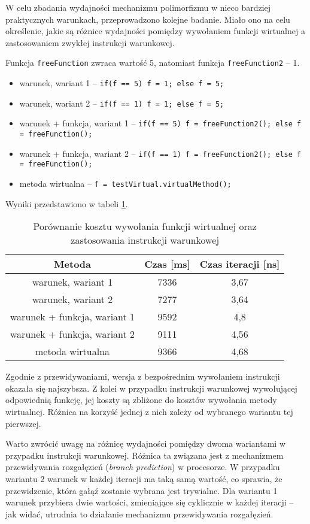 \documentclass{article}
\begin{document}
W celu zbadania wydajności mechanizmu polimorfizmu w nieco bardziej praktycznych warunkach, przeprowadzono kolejne badanie. Miało ono na celu określenie, jakie są różnice wydajności pomiędzy wywołaniem funkcji wirtualnej a zastosowaniem zwykłej instrukcji warunkowej.

Funkcja \texttt{freeFunction} zwraca wartość 5, natomiast funkcja \texttt{freeFunction2} -- 1.

\begin{itemize}
\item warunek, wariant 1 -- \texttt{if(f == 5) f = 1; else f = 5;}
\item warunek, wariant 2 -- \texttt{if(f == 1) f = 1; else f = 5;}
\item warunek + funkcja, wariant 1 -- \texttt{if(f == 5) f = freeFunction2(); else f = freeFunction();}
\item warunek + funkcja, wariant 2 -- \texttt{if(f == 1) f = freeFunction2(); else f = freeFunction();}
\item metoda wirtualna -- \texttt{f = testVirtual.virtualMethod();}
\end{itemize}

Wyniki przedstawiono w tabeli \ref{table:if}.

\begin{table}[H]
\center
\begin{tabular}{ c c c }
  \textbf{Metoda} & \textbf{Czas [ms]} & \textbf{Czas iteracji [ns]} \\ \hline
  warunek, wariant 1 & 7336 & 3,67 \\ \hline
  warunek, wariant 2 & 7277 & 3,64 \\ \hline
  warunek + funkcja, wariant 1 & 9592 & 4,8 \\ \hline
  warunek + funkcja, wariant 2 & 9111 & 4,56 \\ \hline
  metoda wirtualna & 9366 & 4,68 \\
\end{tabular}
\caption{Porównanie kosztu wywołania funkcji wirtualnej oraz zastosowania instrukcji warunkowej}
\label{table:if}
\end{table}

Zgodnie z przewidywaniami, wersja z bezpośrednim wywołaniem instrukcji okazała się najszybsza. Z kolei w przypadku instrukcji warunkowej wywołującej odpowiednią funkcję, jej koszty są zbliżone do kosztów wywołania metody wirtualnej. Różnica na korzyść jednej z nich zależy od wybranego wariantu tej pierwszej.

Warto zwrócić uwagę na różnicę wydajności pomiędzy dwoma wariantami w przypadku instrukcji warunkowej. Różnica ta związana jest z mechanizmem przewidywania rozgałęzień (\textit{branch prediction}) w procesorze. W przypadku wariantu 2 warunek w każdej iteracji ma taką samą wartość, co sprawia, że przewidzenie, która gałąź zostanie wybrana jest trywialne. Dla wariantu 1 warunek przybiera dwie wartości, zmieniające się cyklicznie w każdej iteracji -- jak widać, utrudnia to działanie mechanizmu przewidywania rozgałęzień.
\end{document}
